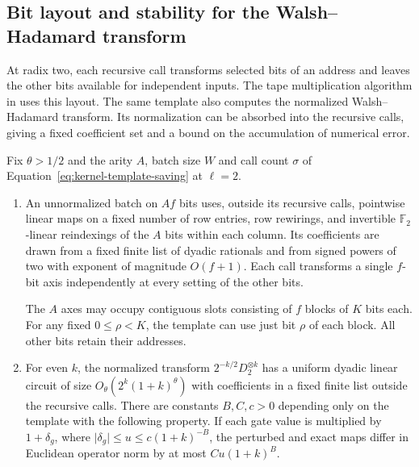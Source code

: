 \subsection{Bit layout and stability for the Walsh--Hadamard transform}
\label{sec:binary}

At radix two, each recursive call transforms selected bits of an
address and leaves the other bits available for independent inputs.
The tape multiplication algorithm in \cite{oaT} uses this layout.
The same template also computes the normalized Walsh--Hadamard
transform. Its normalization can be absorbed into the recursive
calls, giving a fixed coefficient set and a bound on the accumulation
of numerical error.

\begin{proposition}\label{prop:binary-template}
Fix \(\theta>1/2\) and the arity \(A\), batch size \(W\) and call count
\(\sigma\) of Equation~\eqref{eq:kernel-template-saving} at \(\ell=2\).
\begin{enumerate}
\item An unnormalized batch on \(Af\) bits uses, outside its recursive
calls, pointwise linear maps on a fixed number of row entries, row
rewirings, and invertible \(\mathbb F_2\)-linear reindexings of the
\(A\) bits within each column. Its coefficients are drawn from a fixed
finite list of dyadic rationals and from signed powers of two with
exponent of magnitude \(O(f+1)\). Each call transforms a single
\(f\)-bit axis independently at every setting of the other bits.

The \(A\) axes may occupy contiguous slots consisting of \(f\) blocks
of \(K\) bits each. For any fixed \(0\le\rho<K\), the template can use
just bit \(\rho\) of each block. All other bits retain their addresses.
\item For even \(k\), the normalized transform \(2^{-k/2}D_2^{\otimes k}\)
has a uniform dyadic linear circuit of size
\(O_\theta(2^k(1+k)^\theta)\) with coefficients in a fixed finite
list outside the recursive calls. There are constants \(B,C,c>0\)
depending only on the template with the following property. If each
gate value is multiplied by \(1+\delta_g\), where
\(\lvert\delta_g\rvert\le u\le c(1+k)^{-B}\), the perturbed and exact
maps differ in Euclidean operator norm by at most \(Cu(1+k)^B\).
\end{enumerate}
\end{proposition}

